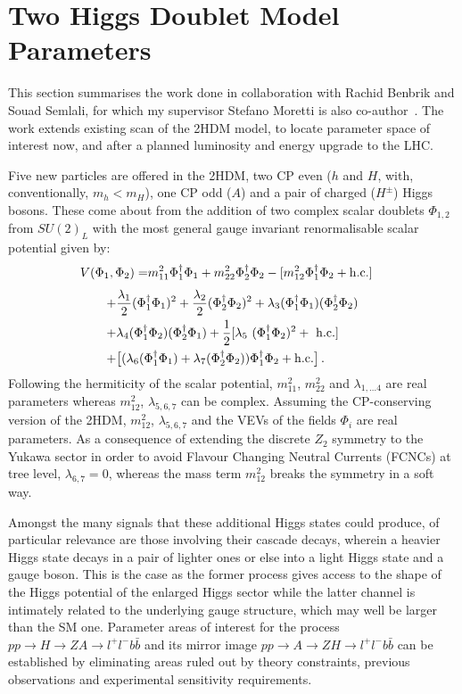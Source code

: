 \section{Two Higgs Doublet Model Parameters}\label{sec:2HDM}

This section summarises the work done in collaboration with Rachid Benbrik and Souad Semlali, 
for which my supervisor Stefano Moretti is also co-author~\cite{benbrik2020mapping}.
The work extends existing scan of the 2HDM model,
to locate parameter space of interest now, and after
a planned luminosity and energy upgrade to the LHC.

Five new particles are offered in the 2HDM,
two CP even (\(h\) and \(H\), with, conventionally, \(m_h < m_H\)),
one CP odd (\(A\))
and a pair of charged (\(H^\pm\)) Higgs bosons.
These come about from the addition of two complex scalar doublets \(\Phi_{1,2}\) from \(SU(2)_L\) with 
the most general gauge invariant renormalisable scalar potential given by:
\begin{align}\nonumber
V(\Phi_1,\Phi_2) =& m_{11}^2\Phi_1^\dagger\Phi_1+m_{22}^2\Phi_2^\dagger\Phi_2-[m_{12}^2\Phi_1^\dagger\Phi_2+{\rm h.c.}] \nonumber
\end{align}
\begin{align}
+& \frac{\lambda_1}{2}(\Phi_1^\dagger\Phi_1)^2
+\frac{\lambda_2}{2}(\Phi_2^\dagger\Phi_2)^2
+\lambda_3(\Phi_1^\dagger\Phi_1)(\Phi_2^\dagger\Phi_2)\nonumber\\
+&\lambda_4(\Phi_1^\dagger\Phi_2)(\Phi_2^\dagger\Phi_1) 
+\frac{1}{2}[\lambda_5~(\Phi_1^\dagger\Phi_2)^2 +~{\rm h.c.}]\nonumber\\
+&\big[ (\lambda_6(\Phi_1^\dagger\Phi_1)
+\lambda_7(\Phi_2^\dagger\Phi_2))
\Phi_1^\dagger\Phi_2+{\rm h.c.}\big] \,. \label{pot1}
\end{align}
Following the hermiticity of the scalar potential, \(m_{11}^2\), \(m_{22}^2\) and \(\lambda_{1,\ldots4}\) are real parameters
whereas \(m_{12}^2\), \(\lambda_{5,6,7}\) can be complex.
Assuming the CP-conserving version of the 2HDM, \(m_{12}^2\), \(\lambda_{5,6,7}\) and the VEVs of the fields \(\Phi_i\) are real parameters.
As a consequence of extending the discrete \(Z_2\) symmetry to the Yukawa sector in order to avoid Flavour Changing Neutral Currents (FCNCs) at tree level,
\(\lambda_{6,7}=0\), whereas the mass term \(m_{12}^2\) breaks the symmetry in a soft way.

Amongst the many signals that these additional Higgs states could produce,
of particular relevance are those involving their cascade decays,
wherein a heavier Higgs state decays in a pair of lighter ones or else into a light Higgs state and a gauge boson.
This is the case as the former process gives access to the shape of the Higgs potential of the enlarged Higgs sector
while the latter channel is intimately related to the underlying gauge structure, which may well be larger than the SM one. 
Parameter areas of interest for the process \(pp\to H\to ZA\to l^+l^-b\bar b\)
and its mirror image \(pp\to A \to ZH\to l^+l^-b\bar{b}\) 
can be established by eliminating areas ruled out by theory constraints,
previous observations and experimental sensitivity requirements.


